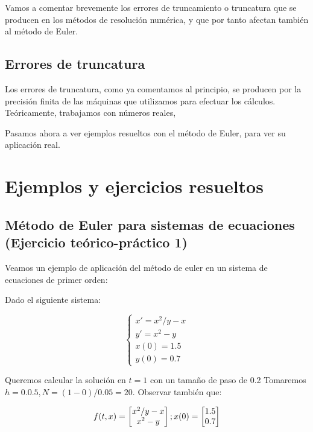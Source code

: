 \documentclass[12pt]{article}       %
\begin{document}
Vamos a comentar brevemente los errores de truncamiento o truncatura que se producen en los métodos de resolución numérica, y que por tanto afectan también al método de Euler.

\subsection{Errores de truncatura}

Los errores de truncatura, como ya comentamos al principio, se producen por la precisión finita de las máquinas que utilizamos para efectuar los cálculos. Teóricamente, trabajamos con números reales, 

Pasamos ahora a ver ejemplos resueltos con el método de Euler, para ver su aplicación real.

\section{Ejemplos y ejercicios resueltos}

\subsection{Método de Euler para sistemas de ecuaciones (Ejercicio teórico-práctico 1)}

Veamos un ejemplo de aplicación del método de euler en un sistema de ecuaciones de primer orden:

Dado el siguiente sistema:

$$
\begin{cases}
x' = x^2/y - x\\
y' = x^2-y \\
x(0) = 1.5\\
y(0)=0.7
\end{cases}
$$

Queremos calcular la solución en $t=1$ con un tamaño de paso de 0.2
Tomaremos $h=0.0.5, N=(1-0)/0.05=20$.
Observar también que:

\begin{equation*}
f(t,x)=\begin{bmatrix}
 x^2/y-x \\
 x^2-y \\
\end{bmatrix};\\
x(0)=\begin{bmatrix}
1.5 \\
0.7
\end{bmatrix}
\end{equation*}
 
\end{document}
